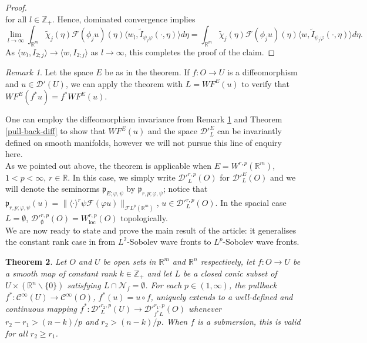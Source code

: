 \documentclass[12pt,reqno]{amsart}
\newcommand{\RR}{\mathbb R}
\newcommand{\ZZ}{\mathbb Z}
\newcommand{\DD}{\mathcal D}
\theoremstyle{plain}
\newtheorem{theorem}{Theorem}[section]
\theoremstyle{remark}
\newtheorem{remark}[theorem]{Remark}
\theoremstyle{definition}
\numberwithin{equation}{section}
\begin{document}
\begin{proof}
\begin{equation*}
\end{equation*}
for all $l\in\ZZ_+$. Hence, dominated convergence implies
\begin{equation*}
\lim_{l\rightarrow\infty}\int_{\RR^m}\widetilde{\chi}_j(\eta)\mathcal{F}(\phi_j u)(\eta)\langle w_l,\widetilde{I}_{\psi_j\varphi}(\cdot,\eta)\rangle d\eta=\int_{\RR^m}\widetilde{\chi}_j(\eta)\mathcal{F}(\phi_j u)(\eta)\langle w,\widetilde{I}_{\psi_j\varphi}(\cdot,\eta)\rangle d\eta.
\end{equation*}
As $\langle w_l,I_{2;j}\rangle\rightarrow\langle w,I_{2;j}\rangle$ as $l\rightarrow\infty$, this completes the proof of the claim.
\end{proof}

\begin{remark}\label{rem-inv-dkslts}
Let the space $E$ be as in the theorem. If $f:O\rightarrow U$ is a diffeomorphism and $u\in\DD'(U)$, we can apply the theorem with $L=WF^E(u)$ to verify that $WF^E(f^*u)=f^*WF^E(u)$.
\end{remark}

One can employ the diffeomorphism invariance from Remark \ref{rem-inv-dkslts} and Theorem \ref{pull-back-diff} to show that $WF^E(u)$ and the space $\DD'^E_L$ can be invariantly defined on smooth manifolds, however we will not pursue this line of enquiry here.\\
\indent As we pointed out above, the theorem is applicable when $E=W^{r,p}(\RR^m)$, $1<p<\infty$, $r\in\RR$. In this case, we simply write $\DD'^{r,p}_L(O)$ for $\DD'^E_L(O)$ and we will denote the seminorms $\mathfrak{p}_{E;\varphi,\psi}$ by $\mathfrak{p}_{r,p;\varphi,\psi}$; notice that $\mathfrak{p}_{r,p;\varphi,\psi}(u)=\|\langle\cdot\rangle^r\psi\mathcal{F}(\varphi u)\|_{\mathcal{F}L^p(\RR^m)}$, $u\in\DD'^{r,p}_L(O)$. In the spacial case $L=\emptyset$, $\DD'^{r,p}_{\emptyset}(O)=W^{r,p}_{\operatorname{loc}}(O)$ topologically.\\
\indent We are now ready to state and prove the main result of the article: it generalises the constant rank case in \cite[Theorem 3.21]{PP} from $L^2$-Sobolev wave fronts to $L^p$-Sobolev wave fronts.

\begin{theorem}\label{the-for-pulbknosklskhtrk}
Let $O$ and $U$ be open sets in $\RR^m$ and $\RR^n$ respectively, let $f:O\rightarrow U$ be a smooth map of constant rank $k\in\ZZ_+$ and let $L$ be a closed conic subset of $U\times (\RR^n\backslash\{0\})$ satisfying $L\cap\mathcal{N}_f=\emptyset$. For each $p\in(1,\infty)$, the pullback $f^*:\mathcal{C}^{\infty}(U)\rightarrow \mathcal{C}^{\infty}(O)$, $f^*(u)=u\circ f$, uniquely extends to a well-defined and continuous mapping $f^*:\DD'^{r_2,p}_L(U)\rightarrow \DD'^{r_1,p}_{f^*L}(O)$ whenever $r_2-r_1>(n-k)/p$ and $r_2>(n-k)/p$. When $f$ is a submersion, this is valid for all $r_2\geq r_1$.
\end{theorem}
\end{document}
